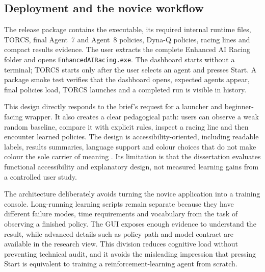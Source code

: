 \subsection{Deployment and the novice workflow}

The release package contains the executable, its required internal runtime files, TORCS, final Agent~7 and Agent~8 policies, Dyna-Q policies, racing lines and compact results evidence. The user extracts the complete Enhanced AI Racing folder and opens \texttt{EnhancedAIRacing.exe}. The dashboard starts without a terminal; TORCS starts only after the user selects an agent and presses Start. A package smoke test verifies that the dashboard opens, expected agents appear, final policies load, TORCS launches and a completed run is visible in history.

This design directly responds to the brief's request for a launcher and beginner-facing wrapper. It also creates a clear pedagogical path: users can observe a weak random baseline, compare it with explicit rules, inspect a racing line and then encounter learned policies. The design is accessibility-oriented, including readable labels, results summaries, language support and colour choices that do not make colour the sole carrier of meaning \parencite{wcag22}. Its limitation is that the dissertation evaluates functional accessibility and explanatory design, not measured learning gains from a controlled user study.

The architecture deliberately avoids turning the novice application into a training console. Long-running learning scripts remain separate because they have different failure modes, time requirements and vocabulary from the task of observing a finished policy. The GUI exposes enough evidence to understand the result, while advanced details such as policy path and model contract are available in the research view. This division reduces cognitive load without preventing technical audit, and it avoids the misleading impression that pressing Start is equivalent to training a reinforcement-learning agent from scratch.

